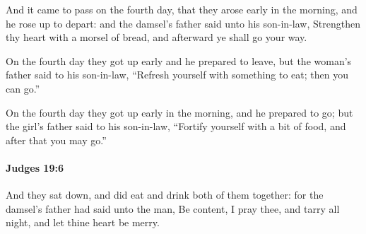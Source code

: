 			\begin{versebox}
					\item[BHS] 
					\item[ASV] And it came to pass on the fourth day, that they arose early in the morning, and he rose up to depart: and the damsel's father said unto his son-in-law, Strengthen thy heart with a morsel of bread, and afterward ye shall go your way.
					\item[NIV] On the fourth day they got up early and he prepared to leave, but the woman’s father said to his son-in-law, “Refresh yourself with something to eat; then you can go.”
					\item[NRSV] On the fourth day they got up early in the morning, and he prepared to go; but the girl’s father said to his son-in-law, “Fortify yourself with a bit of food, and after that you may go.”
			\end{versebox}

		\paragraph{Judges 19:6} %
			\label{JUDGES-19-6}

			And they sat down, and did eat and drink both of them together: for the damsel’s father had said unto the man, Be content, I pray thee, and tarry all night, and let thine heart be merry.

